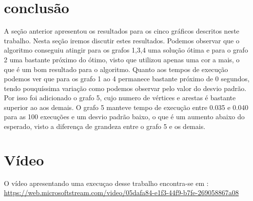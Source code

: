 \documentclass[12pt,openright,oneside,a4paper,brazil]{abntex2}
\begin{document}
\section{conclusão}
A seção anterior apresentou os resultados para os cinco gráficos descritos neste trabalho. Nesta seção iremos discutir estes resultados. Podemos observar que o algoritmo conseguiu atingir para os grafos 1,3,4 uma solução ótima e para o grafo 2 uma  bastante próximo do ótimo, visto que utilizou apenas uma cor a mais, o que é um bom resultado para o algoritmo. 
Quanto aos tempos de execução podemos ver que para os grafo 1 ao 4 permanece bastante próximo de 0 segundos, tendo pouquíssima variação como podemos observar pelo valor do desvio padrão. Por isso foi adicionado o grafo 5, cujo numero de vértices e arestas é bastante superior ao aos demais. O grafo 5 manteve tempo de execução entre 0.035 e 0.040 para as 100 execuções e um desvio padrão baixo, o que é um aumento abaixo do esperado, visto a diferença de grandeza entre o grafo 5 e os demais.

\section{Vídeo}
O vídeo apresentando uma execuçao desse trabalho encontra-se em : \url{https://web.microsoftstream.com/video/05dafa84-e1f3-44f9-b7fe-269058867a08}
    
\end{document}
